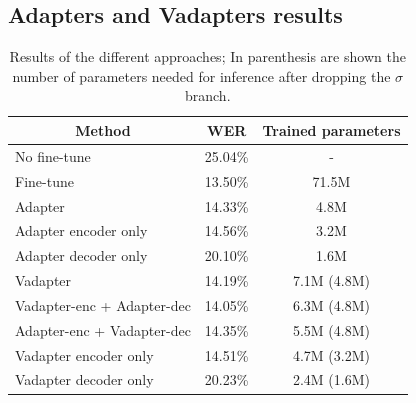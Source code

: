 \subsection{Adapters and Vadapters results}
\begin{table}[t]
\begin{tabular}{ccc}
\hline
 Method & WER     & Trained parameters   \\ \hline
\multicolumn{1}{l}{No fine-tune} & 25.04\%   & - \\ 
\multicolumn{1}{l}{Fine-tune} & 13.50\% & 71.5M \\ \hline
\multicolumn{1}{l}{Adapter}  &   14.33\% & 4.8M  \\ 
\multicolumn{1}{l}{Adapter encoder only }    & 14.56\% & 3.2M  \\ 
\multicolumn{1}{l}{Adapter decoder only} & 20.10\%      & 1.6M  \\ \hline
\multicolumn{1}{l}{Vadapter} & 14.19\%     & 7.1M (4.8M)  \\
\multicolumn{1}{l}{Vadapter-enc + Adapter-dec } & 14.05\%     & 6.3M (4.8M)  \\
\multicolumn{1}{l}{Adapter-enc + Vadapter-dec } & 14.35\%     & 5.5M (4.8M)  \\
\multicolumn{1}{l}{Vadapter encoder only} & 14.51\%     & 4.7M (3.2M)  \\ 
\multicolumn{1}{l}{Vadapter decoder only} & 20.23\%     & 2.4M (1.6M)  \\ \hline

\end{tabular}

\caption{Results of the different approaches; In parenthesis are shown the number of parameters needed for inference after dropping the $\sigma$ branch.}
\label{tab:res}
\end{table}

